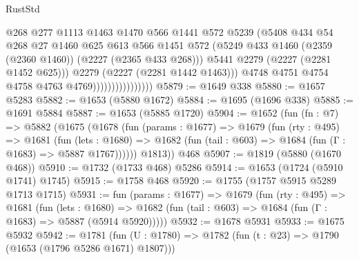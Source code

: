 \begin{lexlean}{RustStd}
\begin{coremodule}
                                      @268
                                      @277
                                      @1113
                                      @1463
                                      @1470
                                      @566
                                      @1441
                                      @572
                                      @5239
                                      (@5408
                                        @434
                                        @54
                                        @268
                                        @27
                                        @1460
                                        @625
                                        @613
                                        @566
                                        @1451
                                        @572
                                        (@5249
                                          @433
                                          @1460
                                          (@2359 (@2360 @1460))
                                          (@2227 (@2365 @433 @268)))
                                        @5441
                                        @2279
                                        (@2227 (@2281 @1452 @625)))
                                      @2279
                                      (@2227 (@2281 @1442 @1463)))
                                    @4748
                                    @4751
                                    @4754
                                    @4758
                                    @4763
                                    @4769))))))))))))))))
@5879 := @1649 @338
@5880 := @1657 @5283
@5882 := @1653 (@5880 @1672)
@5884 := @1695 (@1696 @338)
@5885 := @1691 @5884
@5887 := @1653 (@5885 @1720)
@5904 := @1652
    (fun (fn : @7) =>
    @5882
      (@1675
        (@1678
          (fun (params : @1677) =>
          @1679
            (fun (rty : @495) =>
            @1681
              (fun (lets : @1680) =>
              @1682 (fun (tail : @603) => @1684 (fun (Γ : @1683) => @5887 @1767))))))
        @1813))
    @468
@5907 := @1819 (@5880 (@1670 @468))
@5910 := @1732 (@1733 @468) @5286
@5914 := @1653 (@1724 (@5910 @1741) @1745)
@5915 := @1758 @468
@5920 := @1755 (@1757 @5915 @5289 @1713 @1715)
@5931 := fun (params : @1677) =>
  @1679
    (fun (rty : @495) =>
    @1681
      (fun (lets : @1680) =>
      @1682 (fun (tail : @603) => @1684 (fun (Γ : @1683) => @5887 (@5914 @5920)))))
@5932 := @1678 @5931
@5933 := @1675 @5932
@5942 := @1781 (fun (U : @1780) => @1782 (fun (t : @23) => @1790 (@1653 (@1796 @5286 @1671) @1807)))

\end{coremodule}
\end{lexlean}
